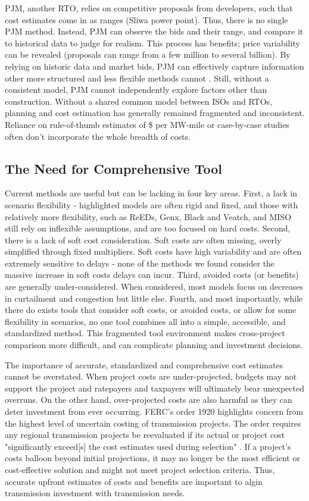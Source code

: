 \documentclass[11pt,twocolumn,a4paper]{article}
\begin{document}
PJM, another RTO, relies on competitive proposals from developers, such that cost estimates come in as ranges (Sliwa power point). Thus, there is no single PJM method. Instead, PJM can observe the bids and their range, and compare it to historical data to judge for realism. This process has benefits; price variability can be revealed (proposals can range from a few million to several billion). By relying on historic data and market bids, PJM can effectively capture information other more structured and less flexible methods cannot \parencite{Tesfa2024PJM}. Still, without a consistent model, PJM cannot independently explore factors other than construction. Without a shared common model between ISOs and RTOs, planning and cost estimation has generally remained fragmented and inconsistent. Reliance on rule-of-thumb estimates of \$ per MW-mile or case-by-case studies often don't incorporate the whole breadth of costs. 

\subsection{The Need for Comprehensive Tool}
Current methods are useful but can be lacking in four key areas. First, a lack in scenario flexibility - highlighted models are often rigid and fixed, and those with relatively more flexibility, such as ReEDs, Genx, Black and Veatch, and MISO still rely on inflexible assumptions, and are too focused on hard costs. Second, there is a lack of soft cost consideration. Soft costs are often missing, overly simplified through fixed multipliers. Soft costs have high variability and are often extremely sensitive to delays - none of the methods we found consider the massive increase in soft costs delays can incur. Third, avoided costs (or benefits) are generally under-considered. When considered, most models focus on decreases in curtailment and congestion but little else. Fourth, and most importantly, while there do exists tools that consider soft costs, or avoided costs, or allow for some flexibility in scenarios, no one tool combines all into a simple, accessible, and standardized method. This fragmented tool environment makes cross-project comparison more difficult, and can complicate planning and investment decisions. 

The importance of accurate, standardized and comprehensive cost estimates cannot be overstated. When project costs are under-projected, budgets may not support the project and ratepayers and taxpayers will ultimately bear unexpected overruns. On the other hand, over-projected costs are also harmful as they can deter investment from ever occurring. FERC's order 1920 highlights concern from the highest level of uncertain costing of transmission projects. The order requires any regional transmission projects be reevaluated if its actual or project cost "significantly exceed[s] the cost estimates used during selection" \parencite{FERC2024JointConcurrence1920}. If a project’s costs balloon beyond initial projections, it may no longer be the most efficient or cost-effective solution and might not meet project selection criteria. Thus, accurate upfront estimates of costs and benefits are important to algin transmission investment with transmission needs. 
\end{document}
